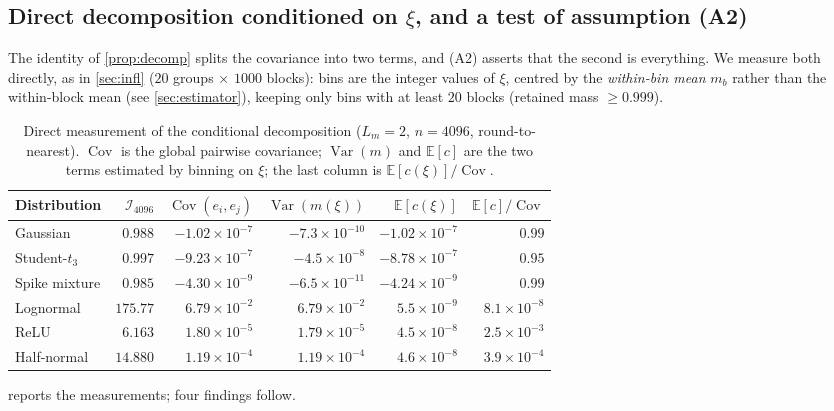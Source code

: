\documentclass[twocolumn,review,hidelinks,oneeqnum,onetabnum,onefignum,onethmnum]{siamart251216}
\begin{document}
\subsection{Direct decomposition conditioned on $\xi$, and a test of
assumption (A2)}
\label{sec:cond}

The identity of \cref{prop:decomp} splits the covariance into two terms, and
(A2) asserts that the second is everything. We measure both directly, as in
\cref{sec:infl} ($20$ groups $\times$ $1000$ blocks): bins are the integer values
of $\xi$, centred by the \emph{within-bin mean} $m_b$ rather than the within-block
mean (see \cref{sec:estimator}), keeping only bins with at least $20$ blocks
(retained mass $\ge0.999$).

\begin{table}[!tb]
\centering
\caption{Direct measurement of the conditional decomposition ($L_m=2$,
$n=4096$, round-to-nearest). $\operatorname{Cov}$ is the global pairwise
covariance; $\operatorname{Var}(m)$ and $\mathbb{E}[c]$ are the two terms
estimated by binning on $\xi$; the last column is
$\mathbb{E}[c(\xi)]/\operatorname{Cov}$.}
\label{tab:cond}
\footnotesize
\begin{tabular}{@{}lrrrrr@{}}
\toprule
Distribution & $\mathcal I_{4096}$ & $\operatorname{Cov}(e_i,e_j)$ & $\operatorname{Var}(m(\xi))$ & $\mathbb{E}[c(\xi)]$ & $\mathbb{E}[c]/\operatorname{Cov}$ \\
\midrule
Gaussian      & $0.988$  & $-1.02\times10^{-7}$ & $-7.3\times10^{-10}$ & $-1.02\times10^{-7}$ & $0.99$ \\
Student-$t_3$ & $0.997$  & $-9.23\times10^{-7}$ & $-4.5\times10^{-8}$  & $-8.78\times10^{-7}$ & $0.95$ \\
Spike mixture & $0.985$  & $-4.30\times10^{-9}$ & $-6.5\times10^{-11}$ & $-4.24\times10^{-9}$ & $0.99$ \\
\midrule
Lognormal     & $\mathbf{175.77}$ & $6.79\times10^{-2}$ & $6.79\times10^{-2}$ & $5.5\times10^{-9}$ & $8.1\times10^{-8}$ \\
ReLU          & $\mathbf{6.163}$  & $1.80\times10^{-5}$ & $1.79\times10^{-5}$ & $4.5\times10^{-8}$ & $2.5\times10^{-3}$ \\
Half-normal   & $\mathbf{14.880}$ & $1.19\times10^{-4}$ & $1.19\times10^{-4}$ & $4.6\times10^{-8}$ & $3.9\times10^{-4}$ \\
\bottomrule
\end{tabular}
\end{table}

 reports the measurements; four findings follow.
\end{document}
